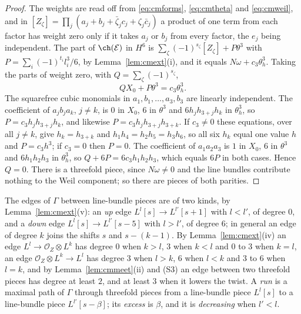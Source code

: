 \begin{proof}
The weights are read off from \eqref{eq:cmforms}, \eqref{eq:cmtheta} and \eqref{eq:cmweil}, and in $[Z_{\zeta}]=\prod_{j}(a_{j}+b_{j}+\bar\zeta_{j}c_{j}+\zeta_{j}\bar c_{j})$ a product of one term from each factor has weight zero only if it takes $a_{j}$ or $b_{j}$ from every factor, the $e_{j}$ being independent. The part of $\ch(\mathcal{E})$ in $H^{6}$ is $\sum_{\zeta}(-1)^{s_{\zeta}}[Z_{\zeta}]+P\theta^{3}$ with $P=\sum_{i}(-1)^{t_{i}}l_{i}^{3}/6$, by Lemma~\ref{lem:cmext}(i), and it equals $N\omega+c_{3}\theta_{h}^{3}$. Taking the parts of weight zero, with $Q=\sum_{\zeta}(-1)^{s_{\zeta}}$,
\[
QX_{0}+P\theta^{3}=c_{3}\theta_{h}^{3}.
\]
The squarefree cubic monomials in $a_{1},b_{1},\dots,a_{3},b_{3}$ are linearly independent. The coefficient of $a_{j}b_{j}a_{k}$, $j\ne k$, is $0$ in $X_{0}$, $6$ in $\theta^{3}$ and $6h_{j}h_{3+j}h_{k}$ in $\theta_{h}^{3}$, so $P=c_{3}h_{j}h_{3+j}h_{k}$, and likewise $P=c_{3}h_{j}h_{3+j}h_{3+k}$. If $c_{3}\ne0$ these equations, over all $j\ne k$, give $h_{k}=h_{3+k}$ and $h_{1}h_{4}=h_{2}h_{5}=h_{3}h_{6}$, so all six $h_{k}$ equal one value $h$ and $P=c_{3}h^{3}$; if $c_{3}=0$ then $P=0$. The coefficient of $a_{1}a_{2}a_{3}$ is $1$ in $X_{0}$, $6$ in $\theta^{3}$ and $6h_{1}h_{2}h_{3}$ in $\theta_{h}^{3}$, so $Q+6P=6c_{3}h_{1}h_{2}h_{3}$, which equals $6P$ in both cases. Hence $Q=0$. There is a threefold piece, since $N\omega\ne0$ and the line bundles contribute nothing to the Weil component; so there are pieces of both parities.
\end{proof}

The edges of $\Gamma$ between line-bundle pieces are of two kinds, by Lemma~\ref{lem:cmext}(v): an \emph{up} edge $L^{l}[s]\to L^{l'}[s+1]$ with $l<l'$, of degree $0$, and a \emph{down} edge $L^{l}[s]\to L^{l'}[s-5]$ with $l>l'$, of degree $6$; in general an edge of degree $k$ joins the shifts $s$ and $s-(k-1)$. By Lemma~\ref{lem:cmext}(iv) an edge $L^{l}\to\mathcal{O}_{Z}\otimes L^{k}$ has degree $0$ when $k>l$, $3$ when $k<l$ and $0$ to $3$ when $k=l$, an edge $\mathcal{O}_{Z}\otimes L^{k}\to L^{l}$ has degree $3$ when $l>k$, $6$ when $l<k$ and $3$ to $6$ when $l=k$, and by Lemma~\ref{lem:cmmeet}(ii) and (S3) an edge between two threefold pieces has degree at least $2$, and at least $3$ when it lowers the twist. A \emph{run} is a maximal path of $\Gamma$ through threefold pieces from a line-bundle piece $L^{l}[s]$ to a line-bundle piece $L^{l'}[s-\beta]$; its \emph{excess} is $\beta$, and it is \emph{decreasing} when $l'<l$.

